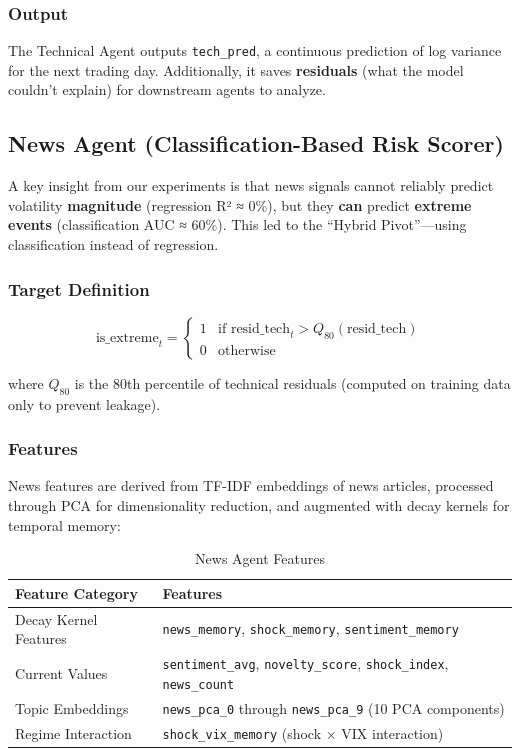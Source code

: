\documentclass[12pt,a4paper]{article}
\begin{document}
\subsubsection{Output}

The Technical Agent outputs \texttt{tech\_pred}, a continuous prediction of log variance for the next trading day. Additionally, it saves \textbf{residuals} (what the model couldn't explain) for downstream agents to analyze.

\subsection{News Agent (Classification-Based Risk Scorer)}

A key insight from our experiments is that news signals cannot reliably predict volatility \textbf{magnitude} (regression R² ≈ 0\%), but they \textbf{can} predict \textbf{extreme events} (classification AUC ≈ 60\%). This led to the ``Hybrid Pivot''---using classification instead of regression.

\subsubsection{Target Definition}

\begin{equation}
    \text{is\_extreme}_t = 
    \begin{cases}
        1 & \text{if } \text{resid\_tech}_t > Q_{80}(\text{resid\_tech}) \\
        0 & \text{otherwise}
    \end{cases}
\end{equation}

where $Q_{80}$ is the 80th percentile of technical residuals (computed on training data only to prevent leakage).

\subsubsection{Features}

News features are derived from TF-IDF embeddings of news articles, processed through PCA for dimensionality reduction, and augmented with decay kernels for temporal memory:

\begin{table}[H]
\centering
\begin{tabular}{ll}
\toprule
\textbf{Feature Category} & \textbf{Features} \\
\midrule
Decay Kernel Features & \texttt{news\_memory}, \texttt{shock\_memory}, \texttt{sentiment\_memory} \\
Current Values & \texttt{sentiment\_avg}, \texttt{novelty\_score}, \texttt{shock\_index}, \texttt{news\_count} \\
Topic Embeddings & \texttt{news\_pca\_0} through \texttt{news\_pca\_9} (10 PCA components) \\
Regime Interaction & \texttt{shock\_vix\_memory} (shock × VIX interaction) \\
\bottomrule
\end{tabular}
\caption{News Agent Features}
\label{tab:news_features}
\end{table}
\end{document}
